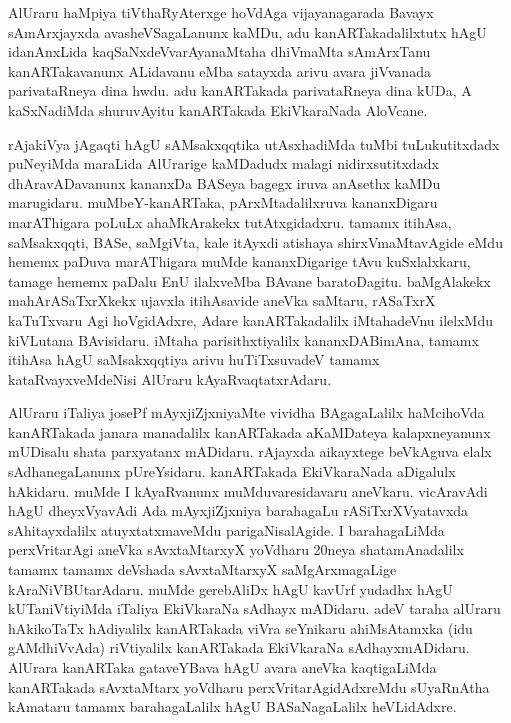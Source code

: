 \documentclass[11pt,a4size]{article}
\begin{document}
AlUraru haMpiya tiVthaRyAterxge hoVdAga vijayanagarada Bavayx
sAmArxjayxda avasheVSagaLanunx kaMDu, adu kanARTakadalilxtutx hAgU
idanAnxLida kaqSaNxdeVvarAyanaMtaha dhiVmaMta sAmArxTanu
kanARTakavanunx ALidavanu eMba satayxda arivu avara jiVvanada
parivataRneya dina hwdu. adu kanARTakada parivataRneya dina kUDa, A
kaSxNadiMda shuruvAyitu kanARTakada EkiVkaraNada AloVcane.

rAjakiVya jAgaqti hAgU sAMsakxqqtika utAsxhadiMda tuMbi tuLukutitxdadx
puNeyiMda maraLida AlUrarige kaMDadudx malagi nidirxsutitxdadx
dhAravADavanunx kananxDa BASeya bagegx iruva anAsethx kaMDu
marugidaru. muMbeY-kanARTaka, pArxMtadalilxruva kananxDigaru
marAThigara poLuLx ahaMkArakekx tutAtxgidadxru. tamamx itihAsa,
saMsakxqqti, BASe, saMgiVta, kale itAyxdi atishaya shirxVmaMtavAgide
eMdu hememx paDuva marAThigara muMde kananxDigarige tAvu kuSxlalxkaru,
tamage hememx paDalu EnU ilalxveMba BAvane baratoDagitu. baMgAlakekx
mahArASaTxrXkekx ujavxla itihAsavide aneVka saMtaru, rASaTxrX
kaTuTxvaru Agi hoVgidAdxre, Adare kanARTakadalilx iMtahadeVnu ilelxMdu
kiVLutana BAvisidaru. iMtaha parisithxtiyalilx kananxDABimAna, tamamx
itihAsa hAgU saMsakxqqtiya arivu huTiTxsuvadeV tamamx
kataRvayxveMdeNisi AlUraru kAyaRvaqtatxrAdaru.

AlUraru iTaliya josePf mAyxjiZjxniyaMte vividha BAgagaLalilx
haMcihoVda kanARTakada janara manadalilx kanARTakada aKaMDateya
kalapxneyanunx mUDisalu shata parxyatanx mADidaru. rAjayxda aikayxtege
beVkAguva elalx sAdhane\-gaLanunx pUreYsidaru. kanARTakada EkiVkaraNada
aDigalulx hAkidaru. muMde I kAyaRvanunx muMduvaresidavaru
aneVkaru. vicAravAdi hAgU dheyxVyavAdi Ada mAyxjiZjxniya barahagaLu
rASiTxrXVyatavxda sAhitayxdalilx atuyxtatxmaveMdu parigaNisalAgide. I
barahagaLiMda perxVritarAgi aneVka sAvxtaMtarxyX yoVdharu 20neya
shatamAnadalilx tamamx tamamx deVshada sAvxtaMtarxyX saMgArxmagaLige
kAraNiVBUtarAdaru. muMde gerebAliDx hAgU kavUrf yudadhx hAgU
kUTaniVtiyiMda iTaliya EkiVkaraNa sAdhayx mADidaru. adeV taraha
alUraru hAkikoTaTx hAdiyalilx kanARTakada viVra seYnikaru
ahiMsAtamxka (idu gAMdhiVvAda) riVtiyalilx kanARTakada EkiVkaraNa
sAdhayxmADidaru. AlUrara kanARTaka gataveYBava hAgU avara aneVka
kaqtigaLiMda kanARTakada sAvxtaMtarx yoVdharu perxVritarAgidAdxreMdu
sUyaRnAtha kAmataru tamamx barahagaLalilx hAgU BASaNagaLalilx
heVLidAdxre.
\end{document}
